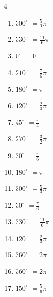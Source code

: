 \begin{multicols}{4}
\begin{enumerate}
  \item $\displaystyle 300^{\circ}$
        $\displaystyle =\frac{5}{3}\pi$

  \item $\displaystyle 330^{\circ}$
        $\displaystyle =\frac{11}{6}\pi$

  \item $\displaystyle 0^{\circ}$
        $\displaystyle =0$

\columnbreak %

\resetques

  \item $\displaystyle 210^{\circ}$
        $\displaystyle =\frac{7}{6}\pi$

  \item $\displaystyle 180^{\circ}$
        $\displaystyle =\pi$

  \item $\displaystyle 120^{\circ}$
        $\displaystyle =\frac{2}{3}\pi$

  \item $\displaystyle 45^{\circ}$
        $\displaystyle =\frac{\pi}{4}$

  \item $\displaystyle 270^{\circ}$
        $\displaystyle =\frac{3}{2}\pi$

  \item $\displaystyle 30^{\circ}$
        $\displaystyle =\frac{\pi}{6}$

  \item $\displaystyle 180^{\circ}$
        $\displaystyle =\pi$

  \item $\displaystyle 300^{\circ}$
        $\displaystyle =\frac{5}{3}\pi$

  \item $\displaystyle 30^{\circ}$
        $\displaystyle =\frac{\pi}{6}$

  \item $\displaystyle 330^{\circ}$
        $\displaystyle =\frac{11}{6}\pi$

  \item $\displaystyle 120^{\circ}$
        $\displaystyle =\frac{2}{3}\pi$

  \item $\displaystyle 360^{\circ}$
        $\displaystyle =2\pi$

  \item $\displaystyle 360^{\circ}$
        $\displaystyle =2\pi$

  \item $\displaystyle 150^{\circ}$
        $\displaystyle =\frac{5}{6}\pi$


\end{enumerate}
\end{multicols}
